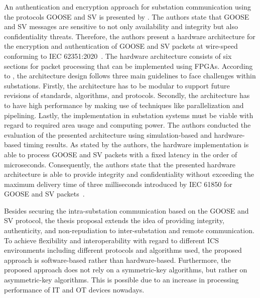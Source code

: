 An authentication and encryption approach for substation communication using the protocols GOOSE and SV is presented by \citeauthor{Rodriguez2021} \cite{Rodriguez2021}.
The authors state that GOOSE and SV messages are sensitive to not only availability and integrity but also confidentiality threats.
Therefore, the authors present a hardware architecture for the encryption and authentication of GOOSE and SV packets at wire-speed conforming to IEC 62351:2020~\cite{IEC62351P6}.
The hardware architecture consists of six sections for packet processing that can be implemented using FPGAs.
According to \citeauthor{Rodriguez2021}, the architecture design follows three main guidelines to face challenges within substations.
Firstly, the architecture has to be modular to support future revisions of standards, algorithms, and protocols.
Secondly, the architecture has to have high performance by making use of techniques like parallelization and pipelining.
Lastly, the implementation in substation systems must be viable with regard to required area usage and computing power.
The authors conducted the evaluation of the presented architecture using simulation-based and hardware-based timing results.
As stated by the authors, the hardware implementation is able to process GOOSE and SV packets with a fixed latency in the order of microseconds.
Consequently, the authors state that the presented hardware architecture is able to provide integrity and confidentiality without exceeding the maximum delivery time of three milliseconds introduced by IEC 61850 for GOOSE and SV packets~\cite{IEC61850P5}.

Besides securing the intra-substation communication based on the GOOSE and SV protocol, the thesis proposal extends the idea of providing integrity, authenticity, and non-repudiation to inter-substation and remote communication.
To achieve flexibility and interoperability with regard to different ICS environments including different protocols and algorithms used, the proposed approach is software-based rather than hardware-based.
Furthermore, the proposed approach does not rely on a symmetric-key algorithms, but rather on asymmetric-key algorithms.
This is possible due to an increase in processing performance of IT and OT devices nowadays.

